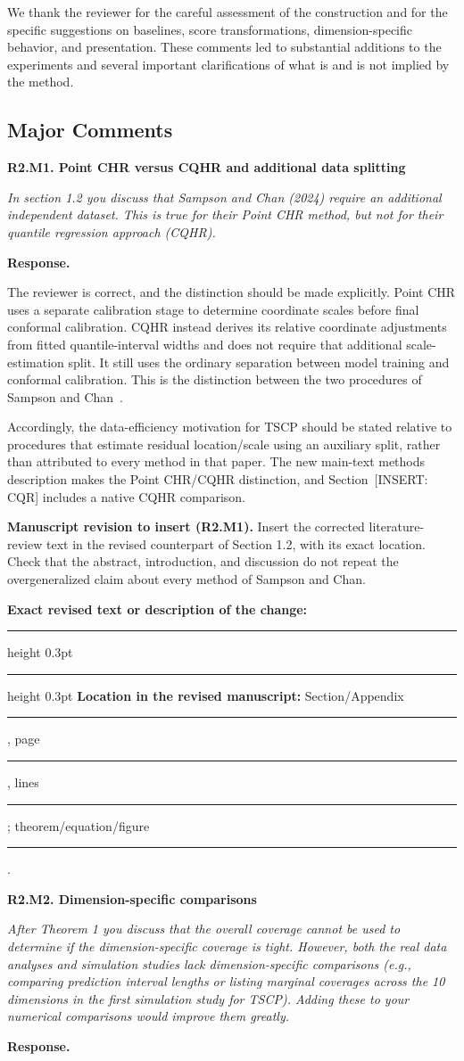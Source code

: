\documentclass[11pt]{article}
\numberwithin{equation}{section}
\newcommand{\pending}[1]{\textcolor{AuthorRed}{[INSERT: #1]}}
\newcommand{\reviewercomment}[2]{%
  \par\medskip\noindent\textbf{#1}\par\nopagebreak
  \begingroup\color{ReviewerBlue}\itshape #2\par\endgroup
  \noindent\textbf{Response.} }
\newcommand{\revisionblock}[2]{%
  \par\begingroup\color{AuthorRed}\small
  \textbf{Manuscript revision to insert (#1).} #2\par
  \textbf{Exact revised text or description of the change:}\par
  \vspace{0.35em}\hrule height 0.3pt\vspace{1.4em}
  \hrule height 0.3pt\vspace{0.6em}
  \textbf{Location in the revised manuscript:}
  Section/Appendix \rule{1.3cm}{0.3pt},
  page \rule{1cm}{0.3pt},
  lines \rule{1.3cm}{0.3pt};
  theorem/equation/figure \rule{1.4cm}{0.3pt}.
  \par\endgroup}
\newcommand{\SecCQR}{Section~\pending{CQR}} %
\begin{document}
We thank the reviewer for the careful assessment of the construction
and for the specific suggestions on baselines, score transformations,
dimension-specific behavior, and presentation. These comments led to
substantial additions to the experiments and several important
clarifications of what is and is not implied by the method.

\subsection{Major Comments}

\reviewercomment{R2.M1. Point CHR versus CQHR and additional data splitting}{%
In section 1.2 you discuss that Sampson and Chan (2024) require an
additional independent dataset. This is true for their Point CHR
method, but not for their quantile regression approach (CQHR).}

The reviewer is correct, and the distinction should be made explicitly.
Point CHR uses a separate calibration stage to determine coordinate
scales before final conformal calibration. CQHR instead derives its
relative coordinate adjustments from fitted quantile-interval widths
and does not require that additional scale-estimation split. It still
uses the ordinary separation between model training and conformal
calibration. This is the distinction between the two procedures of
Sampson and Chan\ \cite{sampson2024}.

Accordingly, the data-efficiency motivation for TSCP should be stated
relative to procedures that estimate residual location/scale using
an auxiliary split, rather than attributed to every method in that
paper. The new main-text methods description makes the Point CHR/CQHR
distinction, and \SecCQR{} includes a native CQHR comparison.

\revisionblock{R2.M1}{Insert the corrected literature-review text in
the revised counterpart of Section 1.2, with its exact location. Check
that the abstract, introduction, and discussion do not repeat the
overgeneralized claim about every method of Sampson and Chan.}

\reviewercomment{R2.M2. Dimension-specific comparisons}{%
After Theorem 1 you discuss that the overall coverage cannot be used
to determine if the dimension-specific coverage is tight. However,
both the real data analyses and simulation studies lack
dimension-specific comparisons (e.g., comparing prediction interval
lengths or listing marginal coverages across the 10 dimensions in
the first simulation study for TSCP). Adding these to your numerical
comparisons would improve them greatly.}
\end{document}
